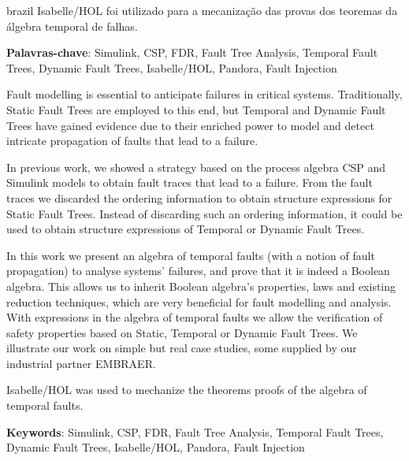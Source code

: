 \documentclass[12pt,openright,twoside,a4paper,oldfontcommands,english,brazil,final]{abntex2}
\theoremstyle{theo}
\begin{document}
\begin{resumo}[Resumo]
\begin{otherlanguage*}{brazil}
Isabelle/HOL foi utilizado para a mecanização das provas dos teoremas da álgebra temporal de falhas.

\vspace{\onelineskip}
\noindent
\textbf{Palavras-chave}: Simulink, CSP, FDR, Fault Tree Analysis, Temporal Fault Trees, Dynamic Fault Trees, Isabelle/HOL, Pandora, Fault Injection
\end{otherlanguage*}
\end{resumo}



\begin{resumo}
Fault modelling is essential to anticipate failures in critical systems.
Traditionally, Static Fault Trees are employed to this end, but Temporal and Dynamic Fault Trees have gained evidence due to their enriched power to model and detect intricate propagation of faults that lead to a failure.

In previous work, we showed a strategy based on the process algebra CSP and Simulink models to obtain fault traces that lead to a failure.
From the fault traces we discarded the ordering information to obtain structure expressions for Static Fault Trees.
Instead of discarding such an ordering information, it could be used to obtain structure expressions of Temporal or Dynamic Fault Trees.

In this work we present an algebra of temporal faults (with a notion of fault propagation) to analyse systems' failures, and prove that it is indeed a Boolean algebra.
This allows us to inherit Boolean algebra's properties, laws and existing reduction techniques, which are very beneficial for fault modelling and analysis.
With expressions in the algebra of temporal faults we allow the verification of safety properties based on Static, Temporal or Dynamic Fault Trees.
We illustrate our work on simple but real case studies, some supplied by our industrial partner EMBRAER.

Isabelle/HOL was used to mechanize the theorems proofs of the algebra of temporal faults.

\vspace{\onelineskip}
\noindent
{}
\textbf{Keywords}: Simulink, CSP, FDR, Fault Tree Analysis, Temporal Fault Trees, Dynamic Fault Trees, Isabelle/HOL, Pandora, Fault Injection
\end{resumo}
\end{document}
